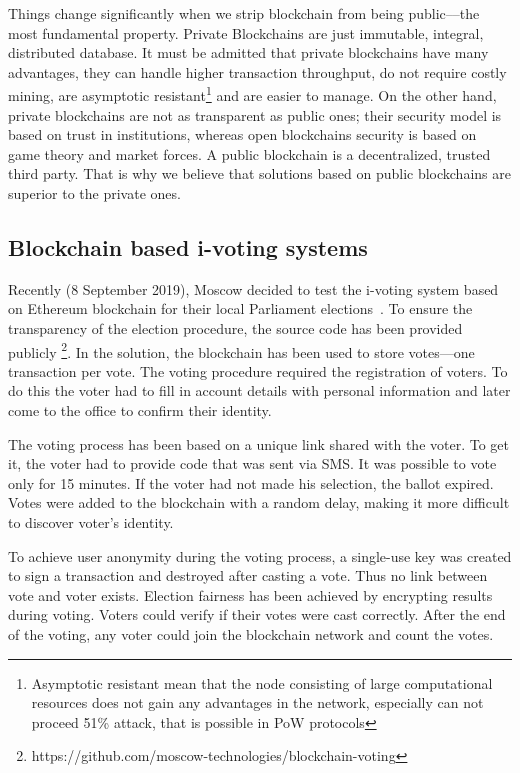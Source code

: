 \documentclass[applsci,article,submit,moreauthors,pdftex]{Definitions/mdpi}
\begin{document}
Things change significantly when we strip blockchain from being public––the most fundamental property. Private Blockchains are just immutable, integral, distributed database. It must be admitted that private blockchains have many advantages, they can handle higher transaction throughput, do not require costly mining, are asymptotic resistant\footnote{Asymptotic resistant mean that the node consisting of large computational resources does not gain any advantages in the network, especially can not proceed 51\% attack, that is possible in PoW protocols} and are easier to manage. On the other hand, private blockchains are not as transparent as public ones; their security model is based on trust in institutions, whereas open blockchains security is based on game theory and market forces. A public blockchain is a decentralized, trusted third party. That is why we believe that solutions based on public blockchains are superior to the private ones.


\subsection{Blockchain based i-voting systems}
\label{related-work}
Recently (8 September 2019), Moscow decided to test the i-voting system based on Ethereum blockchain for their local Parliament elections~\cite{gaudry2019breaking}. 
To ensure the transparency of the election procedure,
the source code has been provided publicly \footnote{https://github.com/moscow-technologies/blockchain-voting}.
In the solution, the blockchain has been used to store votes---one transaction per vote.
The voting procedure required the registration of voters. To do this
the voter had to fill in account details with personal information
and later come to the office to confirm their identity.

The voting process has been based on a unique link shared with the voter. To get it, the voter had to provide code that was sent via SMS. It was possible to vote only for 15 minutes. If the voter had not made his selection, the ballot expired. Votes were added to the blockchain with a random delay, making it more difficult to discover voter's identity.


To achieve user anonymity during the voting process, a single-use key was created to sign a transaction and destroyed after casting a vote. Thus no link between vote and voter exists. Election fairness has been achieved by encrypting results during voting. Voters could verify if their votes were cast correctly. After the end of the voting, any voter could join the blockchain network and count the votes.
\end{document}
